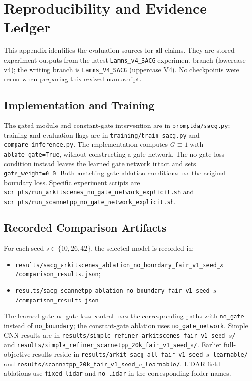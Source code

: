 \section{Reproducibility and Evidence Ledger}
This appendix identifies the evaluation sources for all claims. They are stored experiment outputs from the latest \texttt{Lamns\_v4\_SACG} experiment branch (lowercase v4); the writing branch is \texttt{Lamns\_V4\_SACG} (uppercase V4). No checkpoints were rerun when preparing this revised manuscript.

\subsection{Implementation and Training}
The gated module and constant-gate intervention are in \texttt{promptda/sacg.py}; training and evaluation flags are in \texttt{training/train\_sacg.py} and \texttt{compare\_inference.py}. The implementation computes $G\equiv1$ with \texttt{ablate\_gate=True}, without constructing a gate network. The no-gate-loss condition instead leaves the learned gate network intact and sets \texttt{gate\_weight=0.0}. Both matching gate-ablation conditions use the original boundary loss. Specific experiment scripts are \texttt{scripts/run\_arkitscenes\_no\_gate\_network\_explicit.sh} and \texttt{scripts/run\_scannetpp\_no\_gate\_network\_explicit.sh}.

\subsection{Recorded Comparison Artifacts}
For each seed $s\in\{10,26,42\}$, the selected model is recorded in:
\begin{itemize}
\item \texttt{results/sacg\_arkitscenes\_ablation\_no\_boundary\_fair\_v1\_seed\_$s$/comparison\_results.json};
\item \texttt{results/sacg\_scannetpp\_ablation\_no\_boundary\_fair\_v1\_seed\_$s$/comparison\_results.json}.
\end{itemize}
The learned-gate no-gate-loss control uses the corresponding paths with \texttt{no\_gate} instead of \texttt{no\_boundary}; the constant-gate ablation uses \texttt{no\_gate\_network}. Simple CNN results are in \texttt{results/simple\_refiner\_arkitscenes\_fair\_v1\_seed\_$s$/} and \texttt{results/simple\_refiner\_scannetpp\_20k\_fair\_v1\_seed\_$s$/}. Earlier full-objective results reside in \texttt{results/arkit\_sacg\_all\_fair\_v1\_seed\_$s$\_learnable/} and \texttt{results/scannetpp\_20k\_fair\_v1\_seed\_$s$\_learnable/}. LiDAR-field ablations use \texttt{fixed\_lidar} and \texttt{no\_lidar} in the corresponding folder names.

